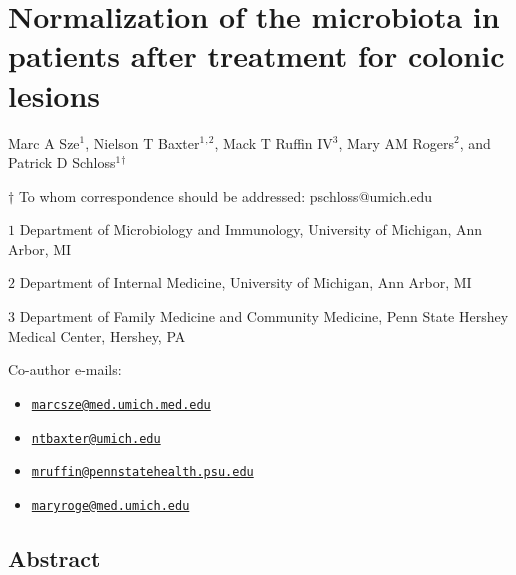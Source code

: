 \documentclass[12pt,]{article}
\title{}
\author{}
\date{}
\providecommand{\tightlist}{%
  \setlength{\itemsep}{0pt}\setlength{\parskip}{0pt}}
\begin{document}
\section{Normalization of the microbiota in patients after treatment for
colonic
lesions}\label{normalization-of-the-microbiota-in-patients-after-treatment-for-colonic-lesions}

\begin{center}
\vspace{25mm}

Marc A Sze${^1}$, Nielson T Baxter${^1}$${^,}$${^2}$, Mack T Ruffin IV${^3}$, Mary AM Rogers${^2}$, and Patrick D Schloss${^1}$${^\dagger}$

\vspace{20mm}

$\dagger$ To whom correspondence should be addressed: pschloss@umich.edu

$1$ Department of Microbiology and Immunology, University of Michigan, Ann Arbor, MI

$2$ Department of Internal Medicine, University of Michigan, Ann Arbor, MI

$3$ Department of Family Medicine and Community Medicine, Penn State Hershey Medical Center, Hershey, PA


\end{center}

Co-author e-mails:

\begin{itemize}
\tightlist
\item
  \href{mailto:marcsze@med.umich.med.edu}{\nolinkurl{marcsze@med.umich.med.edu}}
\item
  \href{mailto:ntbaxter@umich.edu}{\nolinkurl{ntbaxter@umich.edu}}
\item
  \href{mailto:mruffin@pennstatehealth.psu.edu}{\nolinkurl{mruffin@pennstatehealth.psu.edu}}
\item
  \href{mailto:maryroge@med.umich.edu}{\nolinkurl{maryroge@med.umich.edu}}
\end{itemize}

\newpage

\linenumbers

\subsection{Abstract}\label{abstract}
\end{document}
